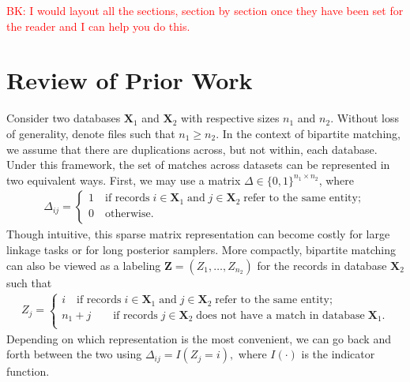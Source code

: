 \documentclass[12pt,letterpaper]{article}
\newcommand{\1}[1]{\mathbb{I}\!\left[#1\right]} %
\begin{document}
{	
\textcolor{red}{BK: I would layout all the sections, section by section once they have been set for the reader and I can help you do this.}	
	
	

\section{Review of Prior Work}
\label{sec:review-of_prior-work}

Consider two databases $\bm{X}_1$ and $\bm{X}_2$ with respective sizes $n_1$ and $n_2$. Without loss of generality, denote files such that $n_1 \geq n_2$. In the context of bipartite matching, we assume that there are duplications across, but not within, each database. Under this framework, the set of matches across datasets can be represented in two equivalent ways. First, we may use a matrix $\Delta \in \{0, 1\}^{n_1 \times n_2}$, where
\begin{align}
	\Delta_{ij} =
	\begin{cases}
		1 \quad \text{if records}\;  i \in \bm{X}_1 \; \text{and}\; j\in \bm{X}_2 \; \text{refer to the same entity}; \\
		0 \quad \text{otherwise}.\\
	\end{cases}
\end{align}
Though intuitive, this sparse matrix representation can become costly for large linkage tasks or for long posterior samplers. More compactly, bipartite matching can also be viewed as a labeling $\bm{Z} = (Z_1, \ldots, Z_{n_2})$ for the records in database $\bm{X}_2$ such that 
\begin{align}
	Z_{j} =
	\begin{cases}
		i \quad \text{if records}\;  i \in \bm{X}_1 \; \text{and}\; j\in \bm{X}_2 \; \text{refer to the same entity}; \\
		n_1 + j \quad  \quad \text{if records}\;  j \in \bm{X}_2 \; \text{does not have a match in database}\; \bm{X}_1. \\
	\end{cases}
\end{align}
Depending on which representation is the most convenient, we can go back and forth between the two using $\Delta_{ij} = I(Z_j = i),$ where $I(\cdot)$ is the indicator function. 

}
\end{document}
